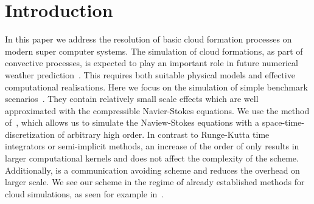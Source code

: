 \documentclass[runningheads]{llncs}
\begin{document}
\section{Introduction}
In this paper we address the resolution of basic cloud formation processes on modern super computer systems.
The simulation of cloud formations, as part of convective processes, is expected to play an important role in future numerical weather prediction~\cite{bauer2015quiet}.
This requires both suitable physical models and effective computational realisations. 
Here we focus on the simulation of simple benchmark scenarios~\cite{giraldo2008study}.
They contain relatively small scale effects which are well approximated with the compressible Navier-Stokes equations.
We use the \aderdg{} method of~\cite{dumbser2008unified}, which allows us to simulate the Naview-Stokes equations with a space-time-discretization of arbitrary high order.
In contrast to Runge-Kutta time integrators or semi-implicit methods, an increase of the order of \aderdg{} only results in larger computational kernels and does not affect the complexity of the scheme.
Additionally, \aderdg{} is a communication avoiding scheme and reduces the overhead on larger scale.
We see our scheme in the regime of already established methods for cloud simulations, as seen for example in~\cite{giraldo2008study,muller2010adaptive,muller2018strong}.
\end{document}
